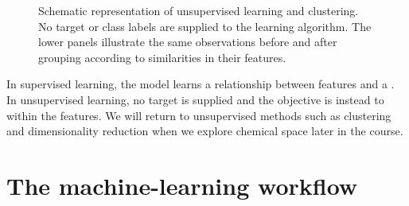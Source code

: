 \begin{figure}[htbp]
{%
  }

  \caption{
    Schematic representation of unsupervised learning and clustering.
    No target or class labels are supplied to the learning algorithm.
    The lower panels illustrate the same observations before and after grouping according to similarities in their features.
  }
  \label{fig2-2:unsupervised-learning}
\end{figure}

\begin{conceptbox}
  In supervised learning, the model learns a relationship between features and a .
  In unsupervised learning, no target is supplied and the objective is instead to  within the features.
  We will return to unsupervised methods such as clustering and dimensionality reduction when we explore chemical space later in the course.
\end{conceptbox}

\section{The machine-learning workflow}

